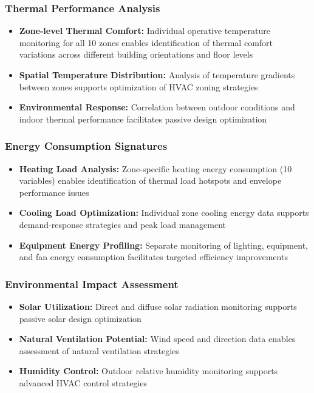 \documentclass[12pt,a4paper]{article}
\begin{document}
{\subsubsection{Thermal Performance Analysis}
\begin{itemize}
    \item \textbf{Zone-level Thermal Comfort:} Individual operative temperature monitoring for all 10 zones enables identification of thermal comfort variations across different building orientations and floor levels
    \item \textbf{Spatial Temperature Distribution:} Analysis of temperature gradients between zones supports optimization of HVAC zoning strategies
    \item \textbf{Environmental Response:} Correlation between outdoor conditions and indoor thermal performance facilitates passive design optimization
\end{itemize}

\subsubsection{Energy Consumption Signatures}
\begin{itemize}
    \item \textbf{Heating Load Analysis:} Zone-specific heating energy consumption (10 variables) enables identification of thermal load hotspots and envelope performance issues
    \item \textbf{Cooling Load Optimization:} Individual zone cooling energy data supports demand-response strategies and peak load management
    \item \textbf{Equipment Energy Profiling:} Separate monitoring of lighting, equipment, and fan energy consumption facilitates targeted efficiency improvements
\end{itemize}

\subsubsection{Environmental Impact Assessment}
\begin{itemize}
    \item \textbf{Solar Utilization:} Direct and diffuse solar radiation monitoring supports passive solar design optimization
    \item \textbf{Natural Ventilation Potential:} Wind speed and direction data enables assessment of natural ventilation strategies
    \item \textbf{Humidity Control:} Outdoor relative humidity monitoring supports advanced HVAC control strategies
\end{itemize}

}
\end{document}
